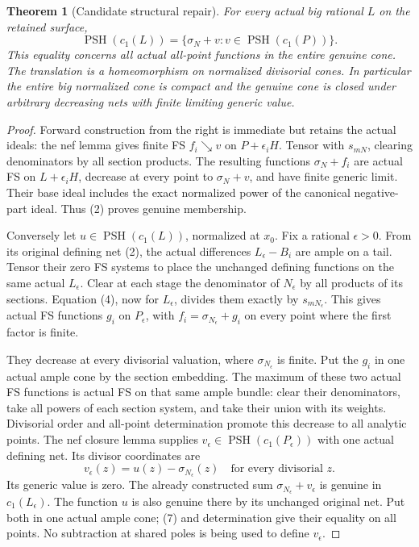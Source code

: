 \documentclass[11pt]{article}
\newcommand{\PSH}{\operatorname{PSH}}
\newtheorem{theorem}{Theorem}
\begin{document}
\begin{theorem}[Candidate structural repair]
For every actual big rational $L$ on the retained surface,
\[
 \PSH(c_1(L))=\{\sigma_N+v:v\in\PSH(c_1(P))\}.            \tag{6}
\]
This equality concerns all actual all-point functions in the entire
genuine cone. The translation is a homeomorphism on normalized
divisorial cones. In particular the entire big normalized cone is
compact and the genuine cone is closed under arbitrary decreasing
nets with finite limiting generic value.
\end{theorem}
\begin{proof}
Forward construction from the right is immediate but retains the
actual ideals: the nef lemma gives finite FS $f_i\searrow v$ on
$P+\epsilon_iH$. Tensor with $s_{mN}$, clearing denominators by
all section products. The resulting functions
$\sigma_N+f_i$ are actual FS on $L+\epsilon_iH$, decrease
at every point to $\sigma_N+v$, and have finite generic limit.
Their base ideal includes the exact normalized power of the
canonical negative-part ideal. Thus (2) proves genuine membership.

Conversely let $u\in\PSH(c_1(L))$, normalized at $x_0$.
Fix a rational $\epsilon>0$. From its original defining net (2),
the actual differences $L_\epsilon-B_i$ are ample on a tail.
Tensor their zero FS systems to place the unchanged defining
functions on the same actual $L_\epsilon$. Clear at each stage
the denominator of $N_\epsilon$ by all products of its sections.
Equation (4), now for $L_\epsilon$, divides them exactly by
$s_{mN_\epsilon}$. This gives actual FS functions $g_i$ on
$P_\epsilon$, with
$f_i=\sigma_{N_\epsilon}+g_i$ on every point where the first
factor is finite.

They decrease at every divisorial valuation, where
$\sigma_{N_\epsilon}$ is finite. Put the $g_i$ in one actual
ample cone by the section embedding. The maximum of these two
actual FS functions is actual FS on that same ample bundle:
clear their denominators, take all powers of each section system,
and take their union with its weights. Divisorial order and all-point
determination promote this decrease to all analytic points.
The nef closure lemma supplies $v_\epsilon\in\PSH(c_1(P_\epsilon))$
with one actual defining net. Its divisor coordinates are
\[
 v_\epsilon(z)=u(z)-\sigma_{N_\epsilon}(z)
               \quad\text{for every divisorial }z.         \tag{7}
\]
Its generic value is zero. The already constructed sum
$\sigma_{N_\epsilon}+v_\epsilon$ is genuine in $c_1(L_\epsilon)$.
The function $u$ is also genuine there by its unchanged original
net. Put both in one actual ample cone; (7) and determination give
their equality on all points. No subtraction at shared poles is
being used to define $v_\epsilon$.


\end{proof}
\end{document}

